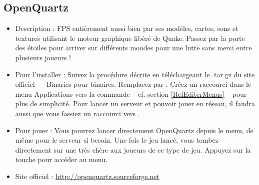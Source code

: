 \subsection{OpenQuartz}
\begin{itemize}
\begingroup
{}
\item Description : FPS entièrement  aussi bien par ses modèles, cartes, sons et textures utilisant le moteur graphique libéré de Quake. Passez par la porte des étoiles pour arriver sur différents mondes pour une lutte sans merci entre plusieurs joueurs !{\par}
\endgroup
\item Pour l'installer : Suivez la procédure décrite en téléchargeant le .tar.gz du site officiel --- Binaries pour binaires. Remplacez  par . Créez un raccourci dans le menu Applications vers la commande  -- cf. section \ref{RefEditerMenus} -- pour plus de simplicité. Pour lancer un serveur et pouvoir jouer en réseau, il faudra aussi que vous fassiez un raccourci vers .{\par}
\item Pour jouer : Vous pourrez lancer directement OpenQuartz depuis le menu, de même pour le serveur si besoin. Une fois le jeu lancé, vous tombez directement sur une  très chère aux joueurs de ce type de jeu. Appuyez sur la touche  pour accéder au menu.{\par}
\item Site officiel : \url{http://openquartz.sourceforge.net}{\par}
\end{itemize}

